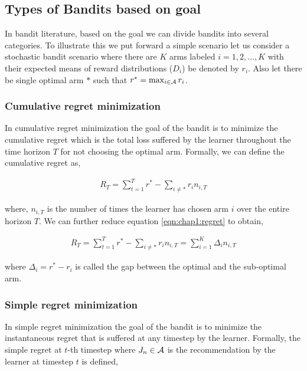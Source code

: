 %





\subsection{Types of Bandits based on goal}

In bandit literature, based on the goal we can divide bandits into several categories. To illustrate this we put forward a simple scenario let us consider a stochastic bandit scenario where there are $K$ arms labeled $i=1,2,\ldots, K$ with their expected means of reward distributions ($D_i$) be denoted by $r_i$. Also let there be single optimal arm $*$ such that $r^* = \max_{i\in\mathcal{A}}r_i$. 



\subsubsection{Cumulative regret minimization}
In cumulative regret minimization the goal of the bandit is to minimize the cumulative regret which is the total loss suffered by the learner throughout the time horizon $T$ for not choosing the optimal arm. Formally, we can define the cumulative regret as,

\begin{eqnarray}
R_{T} = \sum_{t=1}^{T}r^* - \sum_{i\neq *}r_{i}n_{i,T} \label{eqn:chap1:regret}
\end{eqnarray}

where, $n_{i,T}$ is the number of times the learner has chosen arm $i$ over the entire horizon $T$. We can further reduce equation \ref{eqn:chap1:regret} to obtain,

\begin{align*}
R_{T} = \sum_{t=1}^{T}r^* - \sum_{i\neq *}r_{i}n_{i,T} = \sum_{i=1}^{K}\Delta_{i}n_{i,T}
\end{align*}

where $\Delta_{i}=r^* - r_i$ is called the gap between the optimal and the sub-optimal arm.

\subsubsection{Simple regret minimization}
In simple regret minimization the goal of the bandit is to minimize the instantaneous regret that is suffered at any  timestep by the learner. Formally, the simple regret at $t$-th timestep where $J_n\in\mathcal{A}$ is the recommendation by the learner at timestep $t$ is defined,

